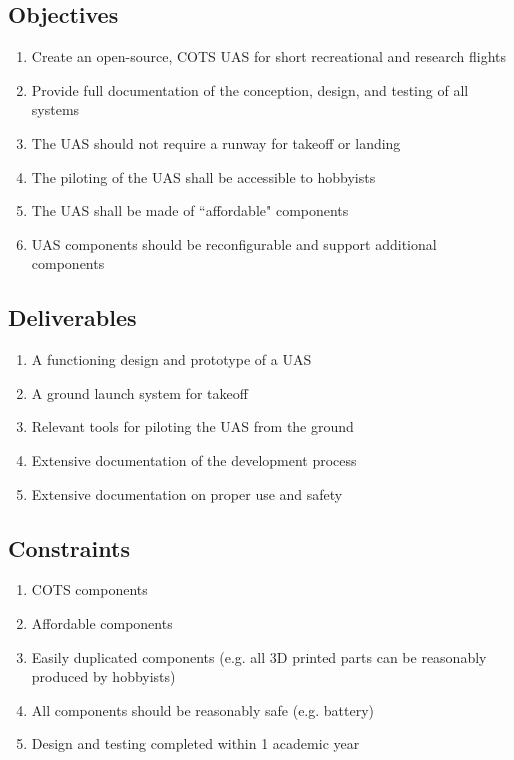﻿\documentclass{article}
\begin{document}
\subsection{Objectives}
\begin{enumerate}
\item Create an open-source, COTS UAS for short recreational and research flights
\item Provide full documentation of the conception, design, and testing of all systems
\item The UAS should not require a runway for takeoff or landing
\item The piloting of the UAS shall be accessible to hobbyists
\item The UAS shall be made of ``affordable" components
\item UAS components should be reconfigurable and support additional components
\end{enumerate}

\subsection{Deliverables}
\begin{enumerate}
\item A functioning design and prototype of a UAS
\item A ground launch system for takeoff
\item Relevant tools for piloting the UAS from the ground
\item Extensive documentation of the development process
\item Extensive documentation on proper use and safety
\end{enumerate}

\subsection{Constraints}
\begin{enumerate}
\item COTS components
\item Affordable components
\item Easily duplicated components (e.g. all 3D printed parts can be reasonably produced by hobbyists)
\item All components should be reasonably safe (e.g. battery)
\item Design and testing completed within 1 academic year
\end{enumerate}
\end{document}
